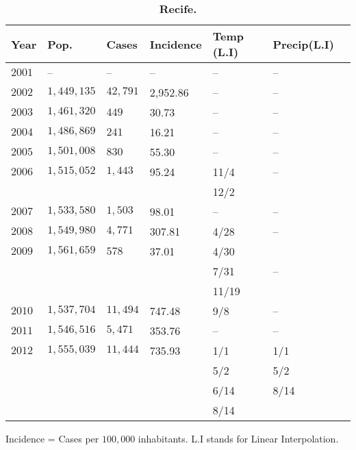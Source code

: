 \documentclass[final,leqno]{siamltexmm2}
\begin{document}
\begin{table}[!ht]
\centering
\caption{
{\bf Recife.}}
\begin{tabular}{|l|l|l|l|l|l|l|}
\hline
\multicolumn{1}{|l|}{\bf Year} & \multicolumn{1}{|l|}{\bf Pop.} & \multicolumn{1}{|l|}{\bf Cases}&\multicolumn{1}{|l|}{\bf Incidence}&\multicolumn{1}{|l|}{\bf Temp (L.I)}&\multicolumn{1}{|l|}{\bf Precip(L.I)} \\ \hline %
$2001$ &     --         &    --     &             --              &  --   &  --  \\ \hline
$2002$ & $1,449,135 $   & $42,791$  & \cellcolor{red!25}2,952.86  &  --   &  --  \\ \hline
$2003$ & $ 1,461,320 $  & $449$     &  \cellcolor{blue!25}30.73   &  --   &  --  \\ \hline
$2004$ & $  1,486,869 $ & $ 241 $   &  \cellcolor{blue!25}16.21   &  --   &  --  \\ \hline
$2005$ & $1,501,008$    & $ 830 $   &  \cellcolor{blue!25}55.30   &  --   &  --  \\ \hline
$2006$ & $  1,515,052$  & $1,443 $  &  \cellcolor{blue!25}95.24   & 11/4  &  --  \\ 
       &                &           &  \cellcolor{blue!25}        & 12/2  &      \\ \hline
$2007$ & $1,533,580 $   & $ 1,503$  &  \cellcolor{blue!25}98.01   &  --   &  --  \\ \hline
$2008$ & $1,549,980$    & $4,771$   &  \cellcolor{red!25}307.81   & 4/28  &  --  \\ \hline
$2009$ & $1,561,659$    & $578$     &  \cellcolor{blue!25}37.01   & 4/30  &      \\ 
       &                &           &  \cellcolor{blue!25}        & 7/31  &  --  \\ 
       &                &           &  \cellcolor{blue!25}        & 11/19 &      \\ \hline
$2010$ & $1,537,704 $   & $11,494$  &  \cellcolor{red!25}747.48   & 9/8   &  --  \\ \hline
$2011$ & $1,546,516 $   & $5,471$   & \cellcolor{red!25}353.76    &  --   &  --  \\ \hline
$2012$ & $1,555,039$    & $11,444$  & \cellcolor{red!25}735.93    &  1/1  &  1/1 \\ 
       &                &           & \cellcolor{red!25}          &  5/2  &  5/2 \\ 
       &                &           &\cellcolor{red!25}           &  6/14 &  8/14\\ 
       &                &           & \cellcolor{red!25}          &  8/14 &      \\ \hline
\end{tabular}
\begin{flushleft} 
\vspace{.5cm}
Incidence = Cases per $100,000$ inhabitants.  L.I stands for Linear Interpolation.
\end{flushleft}
\label{table6}
\end{table}
     
\end{document}
